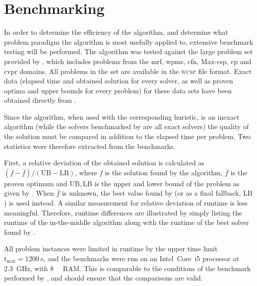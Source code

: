 \section{Benchmarking}
In order to determine the efficiency of the algorithm, and determine what problem paradigm the algorithm is most usefully applied to, extensive benchmark testing will be performed.
The algorithm was tested against the large problem set provided by \textcite{deGivry14}, which includes problems from the \gls{mrf}, \gls{wpms}, \gls{cfn}, Max-\gls{csp}, \gls{cp} and \gls{cvpr} domains.
All problems in the set are available in the \textsc{wcsp} file format.
Exact data (elapsed time and obtained solution for every solver, as well as proven optima and upper bounds for every problem) for these data sets have been obtained directly from \citeauthor{deGivry14}.

Since the algorithm, when used with the corresponding huristic, is an inexact algorithm (while the solvers benchmarked by \textcite{deGivry14} are all exact solvers) the quality of the solution must be compared in addition to the elapsed time per problem.
Two statistics were therefore extracted from the benchmarks.

\label{pg:bench-method}
First, a relative deviation of the obtained solution is calculated as\(\left(f - \bar{f}\right)/(\mathrm{UB}-\mathrm{LB})\), where \(f\) is the solution found by the algorithm, \(\bar{f}\) is the proven optimum and \(\mathrm{UB}, \mathrm{LB}\) is the upper and lower bound of the problem as given by \textcite[\pno~??]{deGivry14}.
When \(\bar{f}\) is unknown, the best value found by \citeauthor{deGivry14} (or as a final fallback, \(\mathrm{LB}\)) is used instead.
A similar measurement for relative deviation of runtime is less meaningful. Therefore, runtime differences are illustrated by simply listing the runtime of the in-the-middle algorithm along with the runtime of the best solver found by \citeauthor{deGivry14}.

All problem instances were limited in runtime by the upper time limit \(t_{\text{max}} = \SI{1200}{\second}\), and the benchmarks were run on an Intel~Core~i5 processor at \SI{2.3}{\giga\hertz}, with \SI{8}{\gibi\byte} RAM.
This is comparable to the conditions of the benchmark performed by \textcite{deGivry14}, and should ensure that the comparisons are valid.
